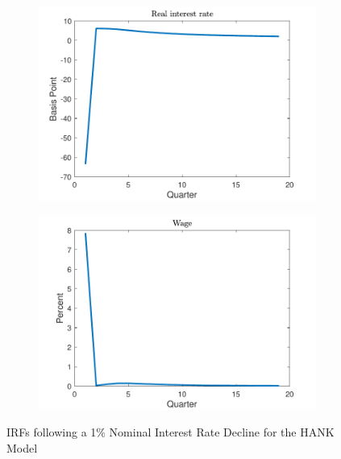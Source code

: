 \documentclass[12pt,a4paper]{article}
\begin{document}
\begin{figure}
\begin{centering}
\begin{subfigure}[b]{0.475\textwidth}
            \centering 
		\includegraphics[scale=0.45]{../Matlab/Figures/IRF_RB.pdf}
            \label{fig:IRF_RB}
        \end{subfigure}
        \quad
        \begin{subfigure}[b]{0.475\textwidth}   
            \centering 
		\includegraphics[scale=0.45]{../Matlab/Figures/IRF_W.pdf}
            \label{fig:IRF_W}
        \end{subfigure}
		\caption{\small{IRFs following a 1\% Nominal Interest Rate Decline for the HANK Model}\normalsize}
	\end{centering}
\end{figure}
\end{document}
